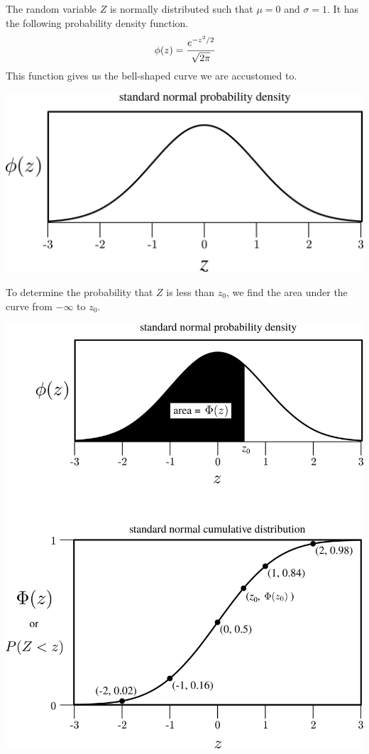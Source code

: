 \documentclass[12pt,letterpaper]{article}
\begin{document}
The random variable $Z$ is normally distributed such that $\mu=0$ and $\sigma=1$. It has the following probability density function.
$$\phi(z) = \cfrac{e^{-z^2/2}}{\sqrt{2\pi}} $$
This function gives us the bell-shaped curve we are accustomed to.
\begin{center}
\includegraphics[scale=.7]{phi.png}
\end{center}
To determine the probability that $Z$ is less than $z_0$, we find the area under the curve from $-\infty$ to $z_0$.
\begin{center}
\includegraphics[scale=.7]{both.png}
\end{center}
\end{document}
